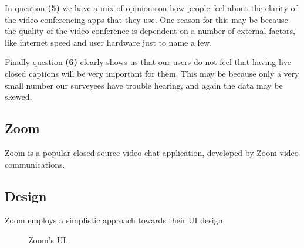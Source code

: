 In question \textbf{(5)} we have a mix of opinions on how
people feel about the clarity of the video conferencing apps
that they use. One reason for this may be because the quality
of the video conference is dependent on a number of external
factors, like internet speed and user hardware just to name
a few. \\ \vspace{0.2cm}

Finally question \textbf{(6)} clearly shows us that our users
do not feel that having live closed captions will be very
important for them. This may be because only a very small
number our surveyees have trouble hearing, and again the
data may be skewed.

\normalsize

\onecolumn

\subsection{Zoom}

Zoom is a popular closed-source video chat application,
developed by Zoom video communications.

\subsection*{Design}

Zoom employs a simplistic approach towards their UI
design.

\begin{figure}[H]

\centering
    \qquad
\centering

\caption{Zoom's UI.}
\label{fig:Zoom}
\end{figure}

